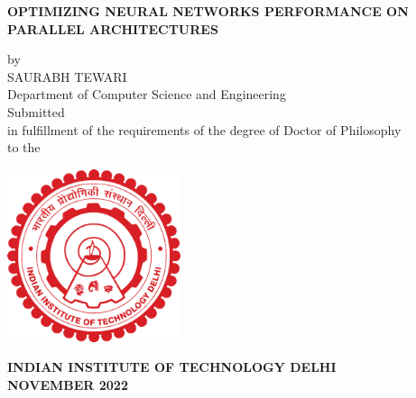 
\begin{center}


\LARGE
\MakeUppercase{\textbf{OPTIMIZING NEURAL NETWORKS PERFORMANCE ON PARALLEL ARCHITECTURES}}\\
\vspace{1cm}

\large

{by}\\
\vspace{.3cm}
{SAURABH TEWARI}\\
\vspace{.3cm}
{Department of Computer Science and Engineering}\\
\vspace{2cm}
{Submitted}\\
\vspace{0.3cm}
{in fulfillment of the requirements of the degree of Doctor of Philosophy}\\
\vspace{3cm}
{to the }\\
\vspace{1cm}

\hspace{0cm}
\centering
\hbox{\includegraphics[width=12pc]{ThesisSpecificPages/iitd-logo.pdf}}

\vspace{0.3cm}
{\bf
\large{INDIAN INSTITUTE OF TECHNOLOGY DELHI}\\
\large{NOVEMBER 2022}\\
}


\end{center}


